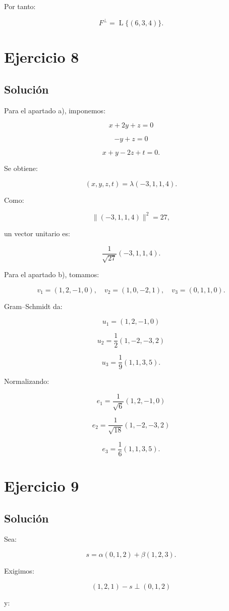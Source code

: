 \documentclass[11pt,a4paper]{article}
\newcommand{\Span}{\operatorname{L}}
\begin{document}
Por tanto:

\[
\boxed{
F^\perp
=
\Span\{(6,3,4)\}.
}
\]

\section{Ejercicio 8}
\subsection{Solución}

Para el apartado a), imponemos:

\[
x+2y+z=0
\]

\[
-y+z=0
\]

\[
x+y-2z+t=0.
\]

Se obtiene:

\[
(x,y,z,t)
=
\lambda(-3,1,1,4).
\]

Como:

\[
\|(-3,1,1,4)\|^2=27,
\]

un vector unitario es:

\[
\boxed{
\frac1{\sqrt{27}}(-3,1,1,4).
}
\]

Para el apartado b), tomamos:

\[
v_1=(1,2,-1,0),
\quad
v_2=(1,0,-2,1),
\quad
v_3=(0,1,1,0).
\]

Gram--Schmidt da:

\[
u_1=(1,2,-1,0)
\]

\[
u_2=\frac12(1,-2,-3,2)
\]

\[
u_3=\frac19(1,1,3,5).
\]

Normalizando:

\[
\boxed{
e_1=
\frac1{\sqrt6}(1,2,-1,0)
}
\]

\[
\boxed{
e_2=
\frac1{\sqrt{18}}(1,-2,-3,2)
}
\]

\[
\boxed{
e_3=
\frac16(1,1,3,5).
}
\]

\section{Ejercicio 9}
\subsection{Solución}

Sea:

\[
s=
\alpha(0,1,2)
+
\beta(1,2,3).
\]

Exigimos:

\[
(1,2,1)-s
\perp
(0,1,2)
\]

y:
\end{document}
